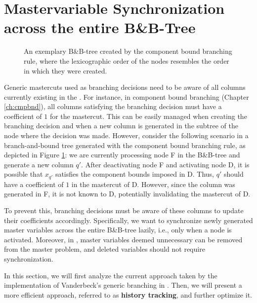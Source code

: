 \section{Mastervariable Synchronization across the entire B\&B-Tree}\label{sec:gm_sync}
\begin{figure}[H]
\centering
{}
\caption{An exemplary B\&B-tree created by the component bound branching rule, where the lexicographic order of the nodes resembles the order in which they were created.}
\label{fig:gm_sync_tree}
\end{figure}

Generic mastercuts used as branching decisions need to be aware of all columns currently existing in the \RMP{}. For instance, in component bound branching (Chapter \ref{ch:cmpbnd}), all columns satisfying the branching decision must have a coefficient of $1$ for the mastercut. This can be easily managed when creating the branching decision and when a new column is generated in the subtree of the node where the decision was made. However, consider the following scenario in a branch-and-bound tree generated with the component bound branching rule, as depicted in Figure \ref{fig:gm_sync_tree}: we are currently processing node F in the B\&B-tree and generate a new column $q'$. After deactivating node F and activating node D, it is possible that $x_{q'}$ satisfies the component bounds imposed in D. Thus, $q'$ should have a coefficient of $1$ in the mastercut of D. However, since the column was generated in F, it is not known to D, potentially invalidating the mastercut of D.

To prevent this, branching decisions must be aware of these columns to update their coefficients accordingly. Specifically, we want to synchronize newly generated master variables across the entire B\&B-tree lazily, i.e., only when a node is activated. Moreover, in \GCG{}, master variables deemed unnecessary can be removed from the master problem, and deleted variables should not require synchronization.

In this section, we will first analyze the current approach taken by the implementation of Vanderbeck's generic branching in \GCG{}. Then, we will present a more efficient approach, referred to as \textbf{history tracking}, and further optimize it.

